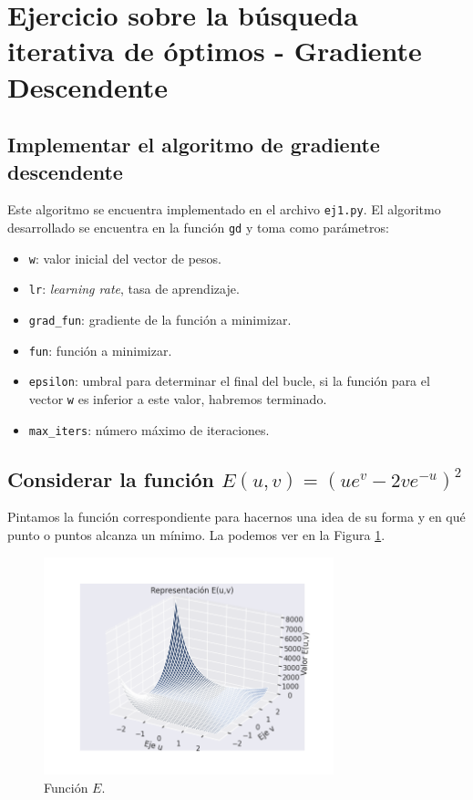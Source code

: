 \documentclass[a4paper, 20pt]{article}
\begin{document}
\large
\section{Ejercicio sobre la búsqueda iterativa de óptimos - Gradiente Descendente}
\subsection{Implementar el algoritmo de gradiente descendente}
Este algoritmo se encuentra implementado en el archivo \texttt{ej1.py}. El algoritmo desarrollado se encuentra en la función \texttt{gd} y toma como parámetros:

\begin{itemize}
\item \texttt{w}: valor inicial del vector de pesos.
\item \texttt{lr}: \textit{learning rate}, tasa de aprendizaje.
\item \texttt{grad\_fun}: gradiente de la función a minimizar.
\item \texttt{fun}: función a minimizar.
\item \texttt{epsilon}: umbral para determinar el final del bucle, si la función para el vector \texttt{w} es inferior a este valor, habremos terminado.
\item \texttt{max\_iters}: número máximo de iteraciones.
\end{itemize}

\subsection{Considerar la función $E(u,v) = (ue^v - 2ve^{-u})^2$}
Pintamos la función correspondiente para hacernos una idea de su forma y en qué punto o puntos alcanza un mínimo. La podemos ver en la Figura \ref{fig:E}.

\begin{figure}[H]
    \centering
    \includegraphics[width=0.75\textwidth]{e1}
    \caption{Función $E$.}
    \label{fig:E}
\end{figure}
\end{document}
